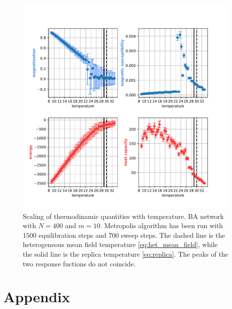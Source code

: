\begin{figure}[H]
    \centering
    \includegraphics[width=\linewidth]{latex_source/images/ising/BA_scaling_num_nodes_400_t_points_50_steps_700_m_10_ti_8.99_tf_32.95.pdf}
    \caption{Scaling of thermodinamic quantities with temperature. BA network with $N=400$ and $m=10$. Metropolis algorithm has been run with $1500$ equilibration steps and $700$ sweep steps. The dashed line is the heterogeneous mean field temperature \ref{eq:het_mean_field}, while the solid line is the replica temperature \ref{eq:replica}. The peaks of the two response fuctions do not coincide.}
    \label{fig:ising_BA_scaling}
\end{figure}

\newpage
\section*{Appendix}

